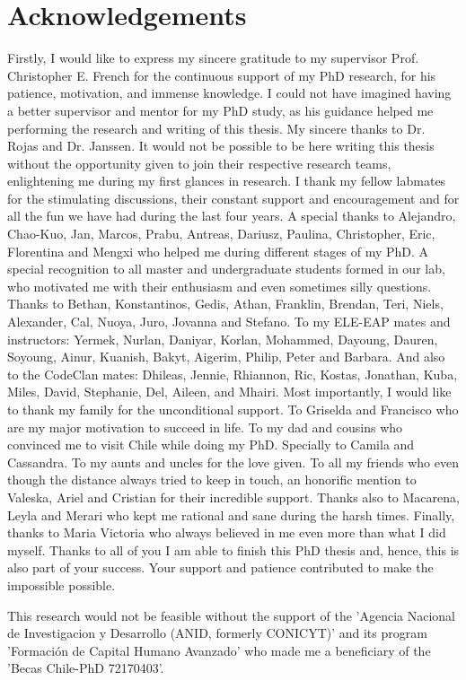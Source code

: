 \chapter{Acknowledgements}


Firstly, I would like to express my sincere gratitude to my supervisor Prof. Christopher E. French for the continuous support of my PhD research, for his patience, motivation, and immense knowledge. I could not have imagined having a better supervisor and mentor for my PhD study, as his guidance helped me performing the research and writing of this thesis.
My sincere thanks to Dr. Rojas and Dr. Janssen. It would not be possible to be here writing this thesis without the opportunity given to join their respective research teams, enlightening me during my first glances in research.
I thank my fellow labmates for the stimulating discussions, their constant support and encouragement and for all the fun we have had during the last four years. A special thanks to Alejandro, Chao-Kuo, Jan, Marcos, Prabu, Antreas, Dariusz, Paulina, Christopher, Eric, Florentina and Mengxi who helped me during different stages of my PhD. A special recognition to all master and undergraduate students formed in our lab, who motivated me with their enthusiasm and even sometimes silly questions. Thanks to Bethan, Konstantinos, Gedis, Athan, Franklin, Brendan, Teri, Niels, Alexander, Cal, Nuoya, Juro, Jovanna and Stefano. 
To my ELE-EAP mates and instructors: Yermek, Nurlan, Daniyar, Korlan, Mohammed, Dayoung, Dauren, Soyoung, Ainur, Kuanish, Bakyt, Aigerim, Philip, Peter and Barbara. And also to the CodeClan mates: Dhileas, Jennie, Rhiannon, Ric, Kostas, Jonathan, Kuba, Miles, David, Stephanie, Del, Aileen, and Mhairi.
Most importantly, I would like to thank my family for the unconditional support. To Griselda and Francisco who are my major motivation to succeed in life. To my dad and cousins who convinced me to visit Chile while doing my PhD. Specially to Camila and Cassandra. To my aunts and uncles for the love given. To all my friends who even though the distance always tried to keep in touch, an honorific mention to Valeska, Ariel and Cristian for their incredible support. Thanks also to Macarena, Leyla and Merari who kept me rational and sane during the harsh times. Finally, thanks to Maria Victoria who always believed in me even more than what I did myself. Thanks to all of you I am able to finish this PhD thesis and, hence, this is also part of your success. Your support and patience contributed to make the impossible possible.

This research would not be feasible without the support of the 'Agencia Nacional de Investigacion y Desarrollo (ANID, formerly CONICYT)' and its program 'Formación de Capital Humano Avanzado' who made me a beneficiary of the 'Becas Chile-PhD 72170403'.
